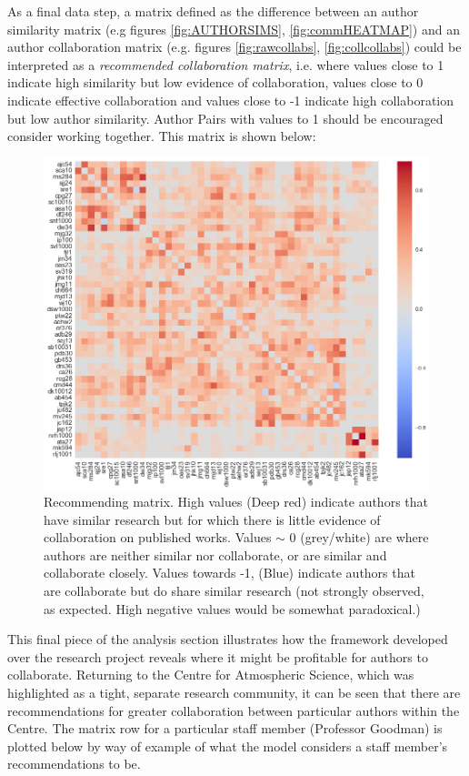 As a final data step, a matrix defined as the difference between an author similarity matrix (e.g figures \ref{fig:AUTHORSIMS}, \ref{fig:commHEATMAP}) and an author collaboration matrix (e.g. figures \ref{fig:rawcollabs}, \ref{fig:collcollabs}) could be interpreted as a \emph{recommended collaboration matrix}, i.e. where values close to 1 indicate high similarity but low evidence of collaboration, values close to 0 indicate effective collaboration and values close to -1 indicate high collaboration but low author similarity. Author Pairs with values to 1 should be encouraged consider working together. This matrix is shown below:
\begin{center}
\begin{figure}[H]
  \centering
    \includegraphics[width=\textwidth]{Analysis/Recommending_Mat.png}
    \caption{Recommending matrix. High values (Deep red) indicate authors that have similar research but for which there is little evidence of collaboration on published works. Values $\sim$ 0 (grey/white) are where authors are neither similar nor collaborate, or are similar and collaborate closely. Values towards -1, (Blue) indicate authors that are collaborate but do share similar research (not strongly observed, as expected. High negative values would be somewhat paradoxical.) }
    \label{fig:RECOMM_MAT}

\end{figure} 
\end{center}
This final piece of the analysis section illustrates how the framework developed over the research project reveals where it might be profitable for authors to collaborate. Returning to the Centre for Atmospheric Science, which was highlighted as a tight, separate research community, it can be seen that there are recommendations for greater collaboration between particular authors within the Centre. The matrix row for a particular staff member (Professor Goodman) is plotted below by way of example of what the model considers a staff member's recommendations to be.
